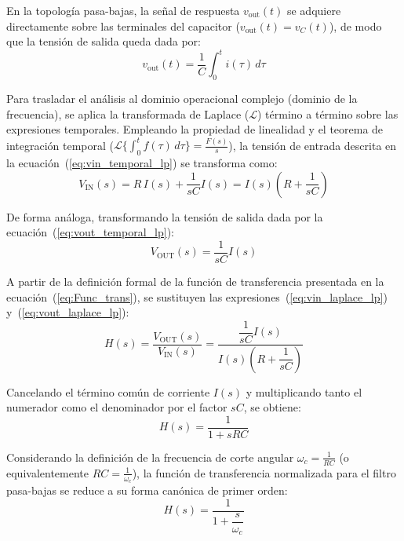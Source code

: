 \documentclass[twocolumn]{article}
\begin{document}
En la topología pasa-bajas, la señal de respuesta $v_{\text{out}}(t)$ se adquiere directamente sobre las terminales del capacitor ($v_{\text{out}}(t) = v_C(t)$), de modo que la tensión de salida queda dada por:
\begin{equation}
v_{\text{out}}(t) = \frac{1}{C} \int_{0}^{t} i(\tau) \, d\tau
\label{eq:vout_temporal_lp}
\end{equation}

Para trasladar el análisis al dominio operacional complejo (dominio de la frecuencia), se aplica la transformada de Laplace ($\mathcal{L}$) término a término sobre las expresiones temporales. Empleando la propiedad de linealidad y el teorema de integración temporal ($\mathcal{L}\{\int_0^t f(\tau)\,d\tau\} = \frac{F(s)}{s}$), la tensión de entrada descrita en la ecuación~(\ref{eq:vin_temporal_lp}) se transforma como:
\begin{equation}
V_{\text{IN}}(s) = R \, I(s) + \frac{1}{sC} I(s) = I(s) \left( R + \frac{1}{sC} \right)
\label{eq:vin_laplace_lp}
\end{equation}

De forma análoga, transformando la tensión de salida dada por la ecuación~(\ref{eq:vout_temporal_lp}):
\begin{equation}
V_{\text{OUT}}(s) = \frac{1}{sC} I(s)
\label{eq:vout_laplace_lp}
\end{equation}

A partir de la definición formal de la función de transferencia presentada en la ecuación~(\ref{eq:Func_trans}), se sustituyen las expresiones~(\ref{eq:vin_laplace_lp}) y~(\ref{eq:vout_laplace_lp}):
\begin{equation}
H(s) = \frac{V_{\text{OUT}}(s)}{V_{\text{IN}}(s)} = \frac{\dfrac{1}{sC} I(s)}{I(s) \left( R + \dfrac{1}{sC} \right)}
\end{equation}

Cancelando el término común de corriente $I(s)$ y multiplicando tanto el numerador como el denominador por el factor $sC$, se obtiene:
\begin{equation}
H(s) = \frac{1}{1 + sRC}
\label{eq:hs_lp}
\end{equation}

Considerando la definición de la frecuencia de corte angular $\omega_c = \frac{1}{RC}$ (o equivalentemente $RC = \frac{1}{\omega_c}$), la función de transferencia normalizada para el filtro pasa-bajas se reduce a su forma canónica de primer orden:
\begin{equation}
H(s) = \frac{1}{1 + \dfrac{s}{\omega_c}}
\end{equation}
\end{document}
